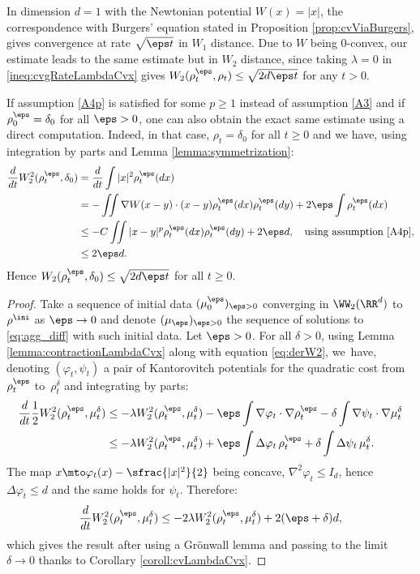 \begin{remark}\label{rmk:burgers:1}
In dimension $d=1$ with the Newtonian potential $W(x) = |x|$, the correspondence with Burgers' equation stated in Proposition \ref{prop:cvViaBurgers}, gives convergence at rate $\sqrt{\eps t}$ in $W_1$ distance. Due to $W$ being $0$-convex, our estimate leads to the same estimate but in $W_2$ distance, since taking $\lambda = 0$ in \eqref{ineq:cvgRateLambdaCvx} gives $W_2(\rho_t^\eps, \rho_t) \leq \sqrt{2d\eps t}$ for any $t>0$.

If assumption \eqref{A4p} is satisfied for some $p\geq 1$ instead of assumption \eqref{A3} and if $\rho_0^\eps = \delta_0$ for all $\eps > 0$, one can also obtain the exact same estimate using a direct computation. Indeed, in that case, $\rho_t = \delta_0$ for all $t\geq 0$ and we have, using integration by parts and Lemma \ref{lemma:symmetrization}:
\begin{align*}
\frac{d}{dt} W_2^2(\rho_t^\eps, \delta_0) & = \frac{d}{dt} \int |x|^2 \rho_t^\eps(dx) \\
& = - \iint \nabla W(x-y) \cdot (x-y) \rho_t^\eps(dx) \rho_t^\eps(dy) + 2\eps \int \rho_t^\eps(dx) \\
& \leq -C\iint |x-y|^p \rho_t^\eps(dx) \rho_t^\eps(dy) + 2\eps d, \quad \text{using assumption \eqref{A4p}}, \\
& \leq 2\eps d.
\end{align*}
Hence $W_2(\rho_t^\eps, \delta_0) \leq \sqrt{2d\eps t}$ for all $t \geq 0$.
\end{remark}
\begin{proof}
Take a sequence of initial data $(\mu_0^\eps)_{\eps>0}$ converging in $\WW_2(\RR^d)$ to $\rho^{\ini}$ as $\eps \to 0$ and denote $(\mu_\eps)_{\eps >0}$ the sequence of solutions to \eqref{eq:agg_diff} with such initial data. Let $\eps >0$. For all $\delta >0$, using Lemma \ref{lemma:contractionLambdaCvx} along with equation \eqref{eq:derW2}, we~have, denoting $(\varphi_t, \psi_t)$ a pair of Kantorovitch potentials for the quadratic cost from~$\rho^\eps_t$ to~$\rho^\delta_t$ and integrating by parts:
\begin{align*}
\frac{d}{dt} \frac 12 W_2^2(\rho_t^\eps, \mu_t^\delta) &\leq -\lambda W_2^2(\rho_t^\eps, \mu_t^\delta) - \eps \int \nabla \varphi_t \cdot \nabla \rho_t^\eps - \delta \int \nabla \psi_t \cdot \nabla \mu_t^\delta \\
&\leq -\lambda W_2^2(\rho_t^\eps, \mu_t^\delta) + \eps \int \Delta \varphi_t \, \rho_t^\eps + \delta \int \Delta \psi_t \, \mu_t^\delta.
\end{align*}
The map $x \mto \varphi_t(x) - \sfrac{|x|^2}{2}$ being concave, $\nabla^2 \varphi_t \leq I_d$, hence $\Delta \varphi_t \leq d$ and the same holds for $\psi_t$. Therefore:
\[
\frac{d}{dt} W_2^2(\rho_t^\eps, \mu_t^\delta) \leq -2\lambda W_2^2(\rho_t^\eps, \mu_t^\delta) + 2(\eps + \delta)d,
\]
which gives the result after using a Grönwall lemma and passing to the limit $\delta \to 0$ thanks to Corollary \ref{coroll:cvLambdaCvx}.
\end{proof}

